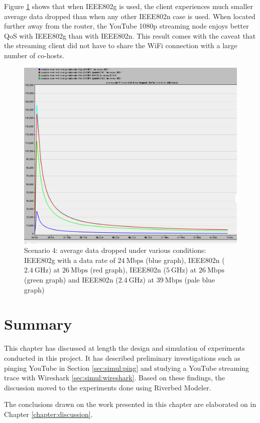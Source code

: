 Figure \ref{fig:4:7} shows that when \gls{IEEE802}g is used, the client experiences much smaller average data dropped than when any other \gls{IEEE802}n case is used. When located further away from the router, the YouTube 1080p streaming node enjoys better \gls{QoS} with \gls{IEEE802}g than with \gls{IEEE802}n. This result comes with the caveat that the streaming client did not have to share the \gls{WiFi} connection with a large number of co-hosts.

\begin{figure}[H]
	\centering
	\includegraphics[scale=0.3]{Figures/amantianrenamed/Scenario4Averagedatadropped.png}
	\caption[Scenario 4: average data dropped under various conditions]{Scenario 4: average data dropped under various conditions: \gls{IEEE802}g with a data rate of $24~\mathrm{Mbps}$ (blue graph), \gls{IEEE802}n ($2.4~\mathrm{GHz}$) at $26~\mathrm{Mbps}$ (red graph), \gls{IEEE802}n ($5~\mathrm{GHz}$) at $26~\mathrm{Mbps}$ (green graph) and \gls{IEEE802}n ($2.4~\mathrm{GHz}$) at $39~\mathrm{Mbps}$ (pale blue graph)}
	\label{fig:4:7}
\end{figure}

\section{Summary} \label{sec:summary}
This chapter has discussed at length the design and simulation of experiments conducted in this project. It has described preliminary investigations such as pinging YouTube in Section \ref{sec:simul:ping} and studying a YouTube streaming trace with Wireshark \ref{sec:simul:wireshark}. Based on these findings, the discussion moved to the experiments done using Riverbed Modeler.

The conclusions drawn on the work presented in this chapter are elaborated on in Chapter \ref{chapter:discussion}.
